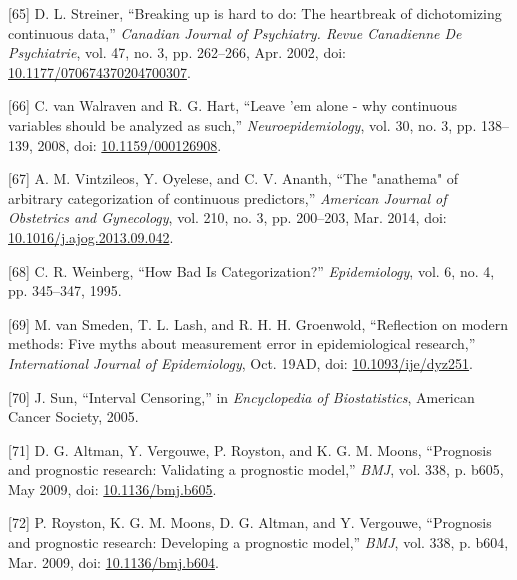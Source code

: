 \documentclass[12pt,PhD,twoside,openright]{muthesis}
\newenvironment{cslreferences}%
  {}%
  {\par}
\begin{document}
\begin{cslreferences}
\leavevmode\hypertarget{ref-streiner_breaking_2002}{}%
{[}65{]} D. L. Streiner, ``Breaking up is hard to do: The heartbreak of dichotomizing continuous data,'' \emph{Canadian Journal of Psychiatry. Revue Canadienne De Psychiatrie}, vol. 47, no. 3, pp. 262--266, Apr. 2002, doi: \href{https://doi.org/10.1177/070674370204700307}{10.1177/070674370204700307}.

\leavevmode\hypertarget{ref-van_walraven_leave_2008}{}%
{[}66{]} C. van Walraven and R. G. Hart, ``Leave 'em alone - why continuous variables should be analyzed as such,'' \emph{Neuroepidemiology}, vol. 30, no. 3, pp. 138--139, 2008, doi: \href{https://doi.org/10.1159/000126908}{10.1159/000126908}.

\leavevmode\hypertarget{ref-vintzileos_anathema_2014}{}%
{[}67{]} A. M. Vintzileos, Y. Oyelese, and C. V. Ananth, ``The "anathema" of arbitrary categorization of continuous predictors,'' \emph{American Journal of Obstetrics and Gynecology}, vol. 210, no. 3, pp. 200--203, Mar. 2014, doi: \href{https://doi.org/10.1016/j.ajog.2013.09.042}{10.1016/j.ajog.2013.09.042}.

\leavevmode\hypertarget{ref-weinberg_how_1995}{}%
{[}68{]} C. R. Weinberg, ``How Bad Is Categorization?'' \emph{Epidemiology}, vol. 6, no. 4, pp. 345--347, 1995.

\leavevmode\hypertarget{ref-van_smeden_reflection_2019}{}%
{[}69{]} M. van Smeden, T. L. Lash, and R. H. H. Groenwold, ``Reflection on modern methods: Five myths about measurement error in epidemiological research,'' \emph{International Journal of Epidemiology}, Oct. 19AD, doi: \href{https://doi.org/10.1093/ije/dyz251}{10.1093/ije/dyz251}.

\leavevmode\hypertarget{ref-sun_interval_2005}{}%
{[}70{]} J. Sun, ``Interval Censoring,'' in \emph{Encyclopedia of Biostatistics}, American Cancer Society, 2005.

\leavevmode\hypertarget{ref-altman_prognosis_2009}{}%
{[}71{]} D. G. Altman, Y. Vergouwe, P. Royston, and K. G. M. Moons, ``Prognosis and prognostic research: Validating a prognostic model,'' \emph{BMJ}, vol. 338, p. b605, May 2009, doi: \href{https://doi.org/10.1136/bmj.b605}{10.1136/bmj.b605}.

\leavevmode\hypertarget{ref-royston_prognosis_2009}{}%
{[}72{]} P. Royston, K. G. M. Moons, D. G. Altman, and Y. Vergouwe, ``Prognosis and prognostic research: Developing a prognostic model,'' \emph{BMJ}, vol. 338, p. b604, Mar. 2009, doi: \href{https://doi.org/10.1136/bmj.b604}{10.1136/bmj.b604}.


\end{cslreferences}
\end{document}
